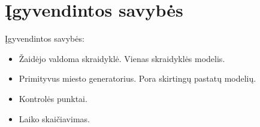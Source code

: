 \section{Įgyvendintos savybės}

Įgyvendintos savybės:
\begin{itemize}
\item Žaidėjo valdoma skraidyklė.
    Vienas skraidyklės modelis.
\item Primityvus miesto generatorius.
    Pora skirtingų pastatų modelių.
\item Kontrolės punktai.
\item Laiko skaičiavimas.
\end{itemize}
